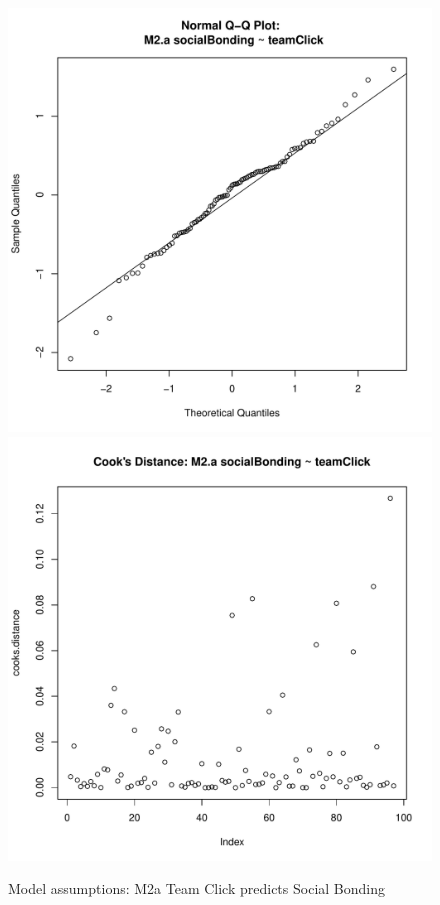 \begin{figure}[htbp]
                \includegraphics[scale =.4]{images/MLM2aQQNorm.pdf}
                \includegraphics[scale =.4]{images/MLM2aCooksD.pdf}
                \caption{Model assumptions: M2a Team Click predicts Social Bonding}
                \label{fig:MLM2aAssumptions}
              \end{figure}




